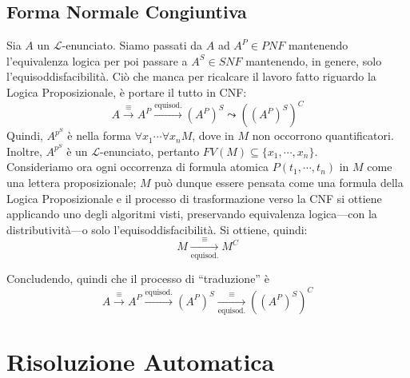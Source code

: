 \subsection{Forma Normale Congiuntiva}
Sia $A$ un $\mathscr{L}$-enunciato. Siamo passati da $A$ ad $A^P \in PNF$ mantenendo l'equivalenza logica per poi passare a $A^S \in SNF$ mantenendo, in genere, solo l'equisoddisfacibilità. Ciò che manca per ricalcare il lavoro fatto riguardo la Logica Proposizionale, è portare il tutto in CNF: 
$$
A \xrightarrow{\equiv} A^P \xrightarrow{\text{equisod.}}(A^P)^S \leadsto ((A^P)^S)^C
$$
Quindi, $A^{p^S}$ è nella forma $\forall x_1 \cdots \forall x_n M$, dove in $M$ non occorrono quantificatori. Inoltre, $A^{p^S}$ è un $\mathscr{L}$-enunciato, pertanto $FV(M) \subseteq \{x_1, \cdots, x_n\}$. \\ 
Consideriamo ora ogni occorrenza di formula atomica $P(t_1, \cdots, t_n)$ in $M$ come una lettera proposizionale; $M$ può dunque essere pensata come una formula della Logica Proposizionale e il processo di trasformazione verso la CNF si ottiene applicando uno degli algoritmi visti, preservando equivalenza logica—con la distributività—o solo l'equisoddisfacibilità. Si ottiene, quindi: 
$$
M \xrightarrow[\text{equisod.}]{\equiv} M^C
$$

Concludendo, quindi che il processo di ``traduzione'' è 
$$
A \xrightarrow{\equiv} A^P \xrightarrow{\text{equisod.}}(A^P)^S \xrightarrow[\text{equisod.}]{\equiv} ((A^P)^S)^C
$$

\section{Risoluzione Automatica}
